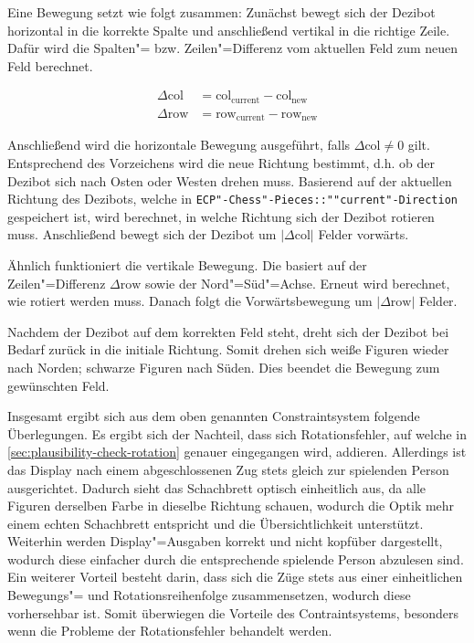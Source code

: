 
Eine Bewegung setzt wie folgt zusammen: Zunächst bewegt sich der Dezibot horizontal in die korrekte Spalte und anschließend vertikal in die richtige Zeile. Dafür wird die Spalten"= bzw. Zeilen"=Differenz vom aktuellen Feld zum neuen Feld berechnet.

\begin{equation*}
    \begin{aligned}
        \Delta\text{col} &= \text{col}_{\text{current}} - \text{col}_{\text{new}} \\
        \Delta\text{row} &= \text{row}_{\text{current}} - \text{row}_{\text{new}}
    \end{aligned}
\end{equation*}

Anschließend wird die horizontale Bewegung ausgeführt, falls $\Delta\text{col} \ne 0$ gilt. Entsprechend des Vorzeichens wird die neue Richtung bestimmt, d.h. ob der Dezibot sich nach Osten oder Westen drehen muss. Basierend auf der aktuellen Richtung des Dezibots, welche in \texttt{ECP"-Chess"-Pieces::""current"-Direction} gespeichert ist, wird berechnet, in welche Richtung sich der Dezibot rotieren muss. Anschließend bewegt sich der Dezibot um $\vert \Delta\text{col} \vert$ Felder vorwärts.

Ähnlich funktioniert die vertikale Bewegung. Die basiert auf der Zeilen"=Differenz $\Delta\text{row}$ sowie der Nord"=Süd"=Achse. Erneut wird berechnet, wie rotiert werden muss. Danach folgt die Vorwärtsbewegung um $\vert \Delta\text{row} \vert$ Felder.

Nachdem der Dezibot auf dem korrekten Feld steht, dreht sich der Dezibot bei Bedarf zurück in die initiale Richtung. Somit drehen sich weiße Figuren wieder nach Norden; schwarze Figuren nach Süden. Dies beendet die Bewegung zum gewünschten Feld.


Insgesamt ergibt sich aus dem oben genannten Constraintsystem folgende Überlegungen. Es ergibt sich der Nachteil, dass sich Rotationsfehler, auf welche in \autoref{sec:plausibility-check-rotation} genauer eingegangen wird, addieren. Allerdings ist das Display nach einem abgeschlossenen Zug stets gleich zur spielenden Person ausgerichtet. Dadurch sieht das Schachbrett optisch einheitlich aus, da alle Figuren derselben Farbe in dieselbe Richtung schauen, wodurch die Optik mehr einem echten Schachbrett entspricht und die Übersichtlichkeit unterstützt. Weiterhin werden Display"=Ausgaben korrekt und nicht kopfüber dargestellt, wodurch diese einfacher durch die entsprechende spielende Person abzulesen sind. Ein weiterer Vorteil besteht darin, dass sich die Züge stets aus einer einheitlichen Bewegungs"= und Rotationsreihenfolge zusammensetzen, wodurch diese vorhersehbar ist. Somit überwiegen die Vorteile des Contraintsystems, besonders wenn die Probleme der Rotationsfehler behandelt werden.


